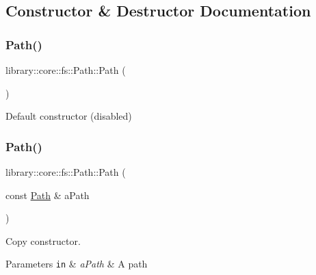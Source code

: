 \subsection{Constructor \& Destructor Documentation}
\mbox{\label{classlibrary_1_1core_1_1fs_1_1Path_aaba9a8e0153813f08f78f1c3275734a4}} 
\subsubsection{\texorpdfstring{Path()}{Path()}\hspace{0.1cm}{\footnotesize\ttfamily [1/2]}}
{\footnotesize\ttfamily library\+::core\+::fs\+::\+Path\+::\+Path (\begin{DoxyParamCaption}{ }\end{DoxyParamCaption})\hspace{0.3cm}{\ttfamily [delete]}}



Default constructor (disabled) 

\mbox{\label{classlibrary_1_1core_1_1fs_1_1Path_aabc4240fc08479d1bff6b9753f2b5cc2}} 
\subsubsection{\texorpdfstring{Path()}{Path()}\hspace{0.1cm}{\footnotesize\ttfamily [2/2]}}
{\footnotesize\ttfamily library\+::core\+::fs\+::\+Path\+::\+Path (\begin{DoxyParamCaption}\item[{const \hyperlink{classlibrary_1_1core_1_1fs_1_1Path}{Path} \&}]{a\+Path }\end{DoxyParamCaption})}



Copy constructor. 


\begin{DoxyParams}[1]{Parameters}
\mbox{\tt in}  & {\em a\+Path} & A path \\
\hline
\end{DoxyParams}


